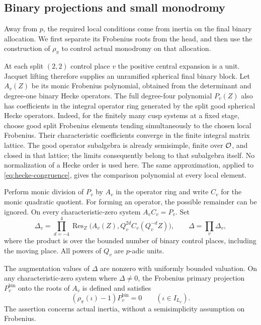 \subsection{Binary projections and small monodromy}
\label{subsec:binary-projections}

Away from $p$, the required local conditions come from inertia on the
final binary allocation.  We first separate its Frobenius roots from
the head, and then use the construction of $\rho_\pi$ to control
actual monodromy on that allocation.

At each split $(2,2)$ control place $v$ the positive central expansion
is a unit.  Jacquet lifting therefore supplies an unramified
spherical final binary block.  Let $A_v(Z)$ be its monic Frobenius
polynomial, obtained from the determinant and degree-one binary
Hecke operators.  The full degree-four polynomial $P_v(Z)$ also has
coefficients in the integral operator ring generated by the split
good spherical Hecke operators.  Indeed, for the finitely many cusp
systems at a fixed stage, choose good split Frobenius elements tending
simultaneously to the chosen local Frobenius.  Their characteristic
coefficients converge in the finite integral matrix lattice.  The
good operator subalgebra is already semisimple, finite over $\mathcal O$,
and closed in that lattice; the limits consequently belong to that
subalgebra itself.  No normalization of a Hecke order is used here.
The same approximation, applied to \cref{eq:hecke-congruence}, gives
the comparison polynomial at every local element.

Perform monic division of $P_v$ by $A_v$ in the operator ring and
write $C_v$ for the monic quadratic quotient.  For forming an
operator, the possible remainder can be ignored.  On every
characteristic-zero system $A_vC_v=P_v$.  Set
\begin{equation}
 \Delta_v=\prod_{d=-4}^{4}
  \operatorname{Res}_Z\bigl(A_v(Z),Q_v^{2d}C_v(Q_v^{-d}Z)\bigr),
 \qquad \Delta=\prod_v\Delta_v,
 \label{eq:separation-resultant}
\end{equation}
where the product is over the bounded number of binary control
places, including the moving place.  All powers of $Q_v$ are
$p$-adic units.

\begin{lemma}
\label{lem:binary-inertia}
The augmentation values of $\Delta$ are nonzero with uniformly
bounded valuation.  On any characteristic-zero system where
$\Delta\ne0$, the Frobenius primary projection $P_v^{\mathrm{bin}}$
onto the roots of $A_v$ is defined and satisfies
\begin{equation}
  (\rho_\pi(\iota)-1)P_v^{\mathrm{bin}}=0
  \qquad(\iota\in I_{L_v}).
 \label{eq:binary-inertia-identity}
\end{equation}
The assertion concerns actual inertia, without a semisimplicity
assumption on Frobenius.
\end{lemma}

